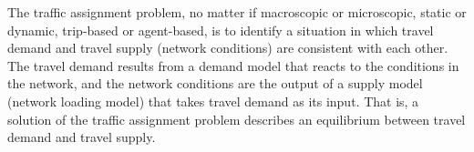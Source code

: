 








The traffic assignment problem, no matter if macroscopic or
microscopic, static or dynamic, trip-based or agent-based, is to
identify a situation in which travel demand and travel supply (network
conditions) are consistent with each other. The travel demand results
from a demand model that reacts to the conditions in the network, and
the network conditions are the output of a supply model
(network loading model) that takes travel demand as its input. That
is, a solution of the traffic assignment problem describes an 
equilibrium between travel demand and travel supply.

